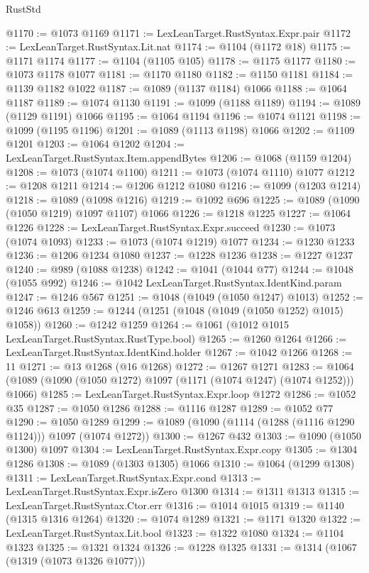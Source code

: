 \begin{lexlean}{RustStd}
\begin{coremodule}
@1170 := @1073 @1169
@1171 := LexLeanTarget.RustSyntax.Expr.pair
@1172 := LexLeanTarget.RustSyntax.Lit.nat
@1174 := @1104 (@1172 @18)
@1175 := @1171 @1174
@1177 := @1104 (@1105 @105)
@1178 := @1175 @1177
@1180 := @1073 @1178 @1077
@1181 := @1170 @1180
@1182 := @1150 @1181
@1184 := @1139 @1182 @1022
@1187 := @1089 (@1137 @1184) @1066
@1188 := @1064 @1187
@1189 := @1074 @1130
@1191 := @1099 (@1188 @1189)
@1194 := @1089 (@1129 @1191) @1066
@1195 := @1064 @1194
@1196 := @1074 @1121
@1198 := @1099 (@1195 @1196)
@1201 := @1089 (@1113 @1198) @1066
@1202 := @1109 @1201
@1203 := @1064 @1202
@1204 := LexLeanTarget.RustSyntax.Item.appendBytes
@1206 := @1068 (@1159 @1204)
@1208 := @1073 (@1074 @1100)
@1211 := @1073 (@1074 @1110) @1077
@1212 := @1208 @1211
@1214 := @1206 @1212 @1080
@1216 := @1099 (@1203 @1214)
@1218 := @1089 (@1098 @1216)
@1219 := @1092 @696
@1225 := @1089 (@1090 (@1050 @1219) @1097 @1107) @1066
@1226 := @1218 @1225
@1227 := @1064 @1226
@1228 := LexLeanTarget.RustSyntax.Expr.succeed
@1230 := @1073 (@1074 @1093)
@1233 := @1073 (@1074 @1219) @1077
@1234 := @1230 @1233
@1236 := @1206 @1234 @1080
@1237 := @1228 @1236
@1238 := @1227 @1237
@1240 := @989 (@1088 @1238)
@1242 := @1041 (@1044 @77)
@1244 := @1048 (@1055 @992)
@1246 := @1042 LexLeanTarget.RustSyntax.IdentKind.param
@1247 := @1246 @567
@1251 := @1048 (@1049 (@1050 @1247) @1013)
@1252 := @1246 @613
@1259 := @1244 (@1251 (@1048 (@1049 (@1050 @1252) @1015) @1058))
@1260 := @1242 @1259
@1264 := @1061 (@1012 @1015 LexLeanTarget.RustSyntax.RustType.bool)
@1265 := @1260 @1264
@1266 := LexLeanTarget.RustSyntax.IdentKind.holder
@1267 := @1042 @1266
@1268 := 11
@1271 := @13 @1268 (@16 @1268)
@1272 := @1267 @1271
@1283 := @1064 (@1089 (@1090 (@1050 @1272) @1097 (@1171 (@1074 @1247) (@1074 @1252))) @1066)
@1285 := LexLeanTarget.RustSyntax.Expr.loop @1272
@1286 := @1052 @35
@1287 := @1050 @1286
@1288 := @1116 @1287
@1289 := @1052 @77
@1290 := @1050 @1289
@1299 := @1089 (@1090 (@1114 (@1288 (@1116 @1290 @1124))) @1097 (@1074 @1272))
@1300 := @1267 @432
@1303 := @1090 (@1050 @1300) @1097
@1304 := LexLeanTarget.RustSyntax.Expr.copy
@1305 := @1304 @1286
@1308 := @1089 (@1303 @1305) @1066
@1310 := @1064 (@1299 @1308)
@1311 := LexLeanTarget.RustSyntax.Expr.cond
@1313 := LexLeanTarget.RustSyntax.Expr.isZero @1300
@1314 := @1311 @1313
@1315 := LexLeanTarget.RustSyntax.Ctor.err
@1316 := @1014 @1015
@1319 := @1140 (@1315 @1316 @1264)
@1320 := @1074 @1289
@1321 := @1171 @1320
@1322 := LexLeanTarget.RustSyntax.Lit.bool
@1323 := @1322 @1080
@1324 := @1104 @1323
@1325 := @1321 @1324
@1326 := @1228 @1325
@1331 := @1314 (@1067 (@1319 (@1073 @1326 @1077)))

\end{coremodule}
\end{lexlean}
